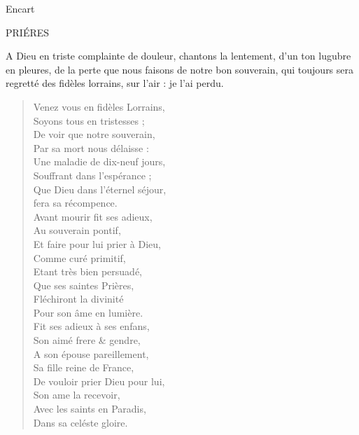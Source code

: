                      
                     \begin{diary}{Encart}{}\begin{Large}PRIÉRES\end{Large}\bigskip
                
                         A Dieu en triste complainte de douleur, chantons la
                              lentement,
                              d’un ton lugubre en pleures, de la perte que nous faisons de
                              notre bon souverain, qui
                              toujours sera regretté des fidèles
                              lorrains, sur l'air : je l'ai perdu. \bigskip
        
        \begin{verse}Venez vous en fidèles Lorrains,\\Soyons tous en tristesses ;\\De voir que notre
                                 souverain,\\Par sa mort nous délaisse :\\Une maladie de dix-neuf jours,\\Souffrant dans l’espérance ;\\Que Dieu dans l'éternel séjour,\\fera sa récompence.\\Avant mourir fit ses adieux,\\Au souverain pontif,\\Et faire pour lui prier à Dieu,\\Comme curé primitif,\\Etant très bien persuadé,\\Que ses saintes Prières,\\Fléchiront la divinité\\Pour son âme en lumière.\\Fit ses
                                 adieux à ses enfans,\\Son aimé frere &
                                 gendre,\\A son épouse
                                 pareillement,\\Sa fille reine de
                                    France,\\De vouloir prier Dieu pour lui,\\Son ame la recevoir,\\Avec les saints en Paradis,\\Dans sa celéste gloire.\\\end{verse}
        \bigskip
        

\end{diary}
